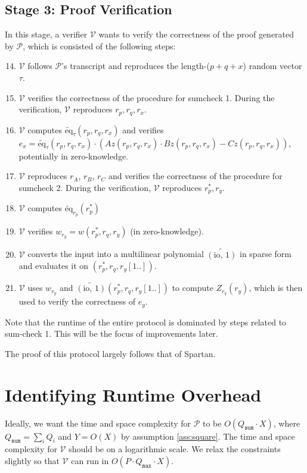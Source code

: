 \documentclass{article}
\newcommand{\Qsum}{Q_{\mathtt{sum}}}
\newcommand{\Qmax}{Q_{\mathtt{max}}}
\renewcommand{\P}{\mathcal{P}}
\newcommand{\V}{\mathcal{V}}
\newcommand{\eq}{\widetilde{\mbox{eq}}}
\newcommand{\io}{\widetilde{(\mbox{io, 1})}}
\begin{document}
\subsection{Stage 3: Proof Verification}\label{stage:verifier}
In this stage, a verifier $\V$ wants to verify the correctness of the proof generated by $\P$, which is consisted of the following steps:
\begin{enumerate}
    \setcounter{enumi}{13}
    \item $\V$ follows $\P$'s transcript and reproduces the length-($p + q + x$) random vector $\tau$.
    \item $\V$ verifies the correctness of the procedure for sumcheck 1. During the verification, $\V$ reproduces $r_p, r_q, r_x$.
    \item $\V$ computes $\eq_\tau(r_p, r_q, r_x)$ and verifies $e_x = \eq_\tau(r_p, r_q, r_x)\cdot (Az(r_p, r_q, r_x)\cdot Bz(r_p, r_q, r_x) - Cz(r_p, r_q, r_x))$, potentially in zero-knowledge.
    \item $\V$ reproduces $r_A$, $r_B$, $r_C$ and verifies the correctness of the procedure for sumcheck 2. During the verification, $\V$ reproduces $r_p^*, r_y$.
    \item $\V$ computes $\eq_{r_p}(r_p^*)$
    \item $\V$ verifies $w_{r_y} = w(r_p^*, r_q, r_y)$ (in zero-knowledge).\label{step:w-verification}
    \item $\V$ converts the input into a multilinear polynomial $\io$ in sparse form and evaluates it on $(r_p^*, r_q, r_y[1..])$.\label{step:io-compute}
    \item $\V$ uses $w_{r_y}$ and $\io(r_p^*, r_q, r_y[1..])$ to compute $Z_{r_q}(r_y)$, which is then used to verify the correctness of $e_y$.
\end{enumerate}

Note that the runtime of the entire protocol is dominated by steps related to sum-check 1. This will be the focus of improvements later.

The proof of this protocol largely follows that of Spartan.

\section{Identifying Runtime Overhead}\label{identify}
Ideally, we want the time and space complexity for $\P$ to be $O(\Qsum \cdot X)$, where $\Qsum = \sum_i Q_i$ and $Y = O(X)$ by assumption \ref{ass:square}. The time and space complexity for $\V$ should be on a logarithmic scale. We relax the constraints slightly so that $\V$ can run in $O(P\cdot \Qmax \cdot X)$.
\end{document}
